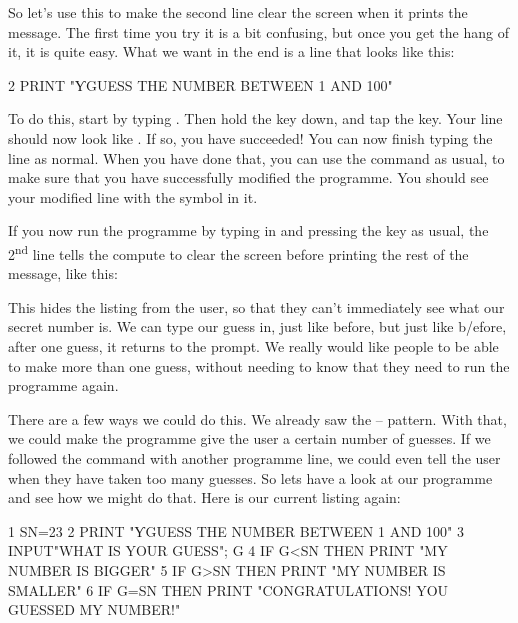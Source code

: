 \needspace{3cm}
So let's use this to make the second line clear the screen when it
prints the  message.  The
first time you try it is a bit confusing, but once you get the hang of
it, it is quite easy.  What we want in the end is a line that looks
like this:

\begin{screenoutput}
2 PRINT "ƳGUESS THE NUMBER BETWEEN 1 AND 100"
\end{screenoutput}

To do this, start by typing .  Then hold the
 key down, and tap the  key.
Your line should now look like .  If so, you have
succeeded! You can now finish typing the line as normal.  When you
have done that, you can use the  command as usual, to make
sure that you have successfully modified the programme.   You should
see your modified line with the  symbol in it.


\needspace{2cm}
If you now run the programme by typing in  and pressing the
 key as usual, the 2\textsuperscript{nd} line tells
the compute to clear the screen before printing the rest of the message, like this:


This hides the listing from the user, so that they can't immediately see
what our secret number is.  We can type our guess in, just like before,
but just like b/efore, after one guess, it returns to the 
prompt.  We really would like people to be able to make more than one
guess, without needing to know that they need to run the programme
again.

\needspace{3cm}
There are a few ways we could do this. We already saw the  --
 pattern. With that, we could make the programme give the
user a certain number of guesses.  If we followed the 
command with another programme line, we could even tell the user when
they have taken too many guesses.  So lets have a look at our
programme and see how we might do that.  Here is our current listing again:

\begin{screentext}
1 SN=23                                                                          
2 PRINT "ƳGUESS THE NUMBER BETWEEN 1 AND 100"                                    
3 INPUT"WHAT IS YOUR GUESS"; G                                                    
4 IF G<SN THEN PRINT "MY NUMBER IS BIGGER"                                       
5 IF G>SN THEN PRINT "MY NUMBER IS SMALLER"                                      
6 IF G=SN THEN PRINT "CONGRATULATIONS! YOU GUESSED MY NUMBER!"       
\end{screentext}


